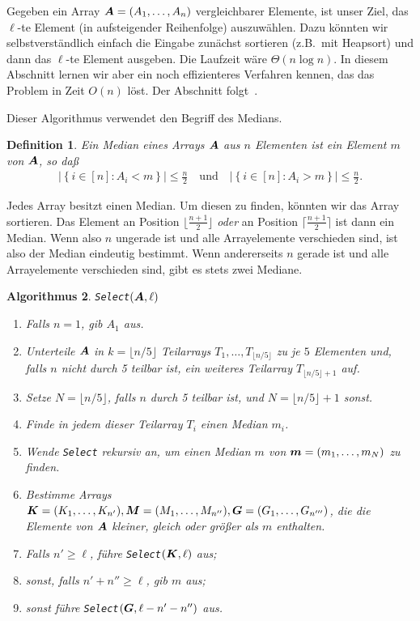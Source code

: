 \documentclass[10pt,reqno]{amsart}
\numberwithin{equation}{section}
\newcommand\vA{\vec A}
\newcommand\vG{\vec G}
\newcommand\vK{\vec K}
\newcommand\vM{\vec M}
\newcommand\vm{\vec m}
\def\vec#1{\mathchoice{\mbox{\boldmath$\displaystyle#1$}}
{\mbox{\boldmath$\textstyle#1$}}
{\mbox{\boldmath$\scriptstyle#1$}}
{\mbox{\boldmath$\scriptscriptstyle#1$}}}
\newtheorem{definition}{Definition}[section]
\newtheorem{algorithm}[definition]{Algorithmus}
\newcommand\cbc[1]{\left\{{#1}\right\}}
\newcommand\abs[1]{\left|{#1}\right|}
\begin{document}
\noindent
Gegeben ein Array $\vA=(A_1,\ldots,A_n)$ vergleichbarer Elemente, ist unser Ziel, das $\ell$-te Element (in aufsteigender Reihenfolge) auszuw\"ahlen.
Dazu k\"onnten wir selbstverst\"andlich einfach die Eingabe zun\"achst sortieren (z.B.\ mit Heapsort) und dann das $\ell$-te Element ausgeben.
Die Laufzeit w\"are $\Theta(n\log n)$.
In diesem Abschnitt lernen wir aber ein noch effizienteres Verfahren kennen, das das Problem in Zeit $O(n)$ l\"ost.
Der Abschnitt folgt~\cite{Cormen}.

Dieser Algorithmus verwendet den Begriff des Medians.

\begin{definition}\label{def_median}
Ein \emph{Median} eines Arrays $\vA$ aus $n$ Elementen ist ein Element $m$ von $\vA$, so da\ss\
\begin{align*}
	\abs{\cbc{i\in[n]:A_i<m}}\leq\frac n2\quad\mbox{und}\quad\abs{\cbc{i\in[n]:A_i>m}}\leq\frac n2.
\end{align*}
\end{definition}

Jedes Array besitzt einen Median.
Um diesen zu finden, k\"onnten wir das Array sortieren. 
Das Element an Position $\lfloor\frac{n+1}2\rfloor$ {\em oder} an Position $\lceil\frac{n+1}2\rceil$ ist dann ein Median.
Wenn also $n$ ungerade ist und alle Arrayelemente verschieden sind, ist also der Median eindeutig bestimmt.
Wenn andererseits $n$ gerade ist und alle Arrayelemente verschieden sind, gibt es stets zwei Mediane.

\begin{algorithm}
	{\tt Select}$(\vA,\ell)$
	\begin{enumerate}
		\item Falls $n=1$, gib $A_1$ aus.
		\item Unterteile $\vA$ in $k=\lfloor n/5\rfloor$ Teilarrays $T_1,\ldots,T_{\lfloor n/5\rfloor}$ zu je $5$ Elementen und, falls $n$ nicht durch 5 teilbar ist, ein weiteres Teilarray $T_{\lfloor n/5\rfloor+1}$ auf.
		\item Setze $N=\lfloor n/5\rfloor$, falls $n$ durch 5 teilbar ist, und $N=\lfloor n/5\rfloor+1$ sonst.
		\item Finde in jedem dieser Teilarray $T_i$ einen Median $m_i$.
		\item Wende {\tt Select} rekursiv an, um einen Median $m$ von $\vm=(m_1,\ldots,m_N)$ zu finden.
		\item Bestimme Arrays $\vK=(K_1,\ldots,K_{n'}),\vM=(M_1,\ldots,M_{n''}),\vG=(G_1,\ldots,G_{n'''})$, die die Elemente von $\vA$ kleiner, gleich oder gr\"o\ss er als $m$ enthalten.
		\item Falls $n'\geq\ell$, f\"uhre {\tt Select}$(\vK,\ell)$ aus;
		\item sonst, falls $n'+n''\geq\ell$, gib $m$ aus;
		\item sonst f\"uhre {\tt Select}$(\vG,\ell-n'-n'')$ aus.
	\end{enumerate}
\end{algorithm}
\end{document}
